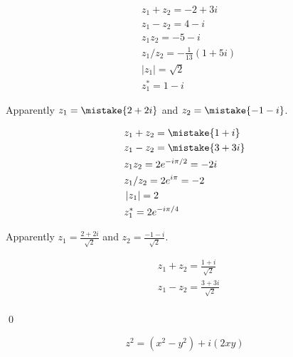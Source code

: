 \documentclass[12pt]{article}
\begin{document}
\begin{equation}
    \begin{split}
        &z_{1} + z_{2} = -2 + 3i \\
        &z_{1} - z_{2} = 4 - i \\
        &z_{1} z_{2} = -5 - i \\
        &z_{1}/z_{2} = -\frac{1}{13} (1 + 5i) \\
        &\left\lvert z_{1} \right\rvert = \sqrt{2} \\
        &z_{1}^{*} = 1 - i
    \end{split}
\end{equation}

Apparently $z_{1} = \mistake{2 + 2i}$ and $z_{2} = \mistake{-1 - i}$.

\begin{equation}
    \begin{split}
        &z_{1} + z_{2} = \mistake{1 + i} \\
        &z_{1} - z_{2} = \mistake{3 + 3i} \\
        &z_{1} z_{2} = 2 e^{-i \pi/2} = -2i\\
        &z_{1}/z_{2} = 2 e^{i \pi} = -2\\
        &\left\lvert z_{1} \right\rvert = 2 \\
        &z_{1}^{*} = 2 e^{-i \pi/4}
    \end{split}
\end{equation}

\begin{correction}
    Apparently $z_{1} = \frac{2 + 2i}{\sqrt{2}}$ and $z_{2} = \frac{-1 - i}{\sqrt{2}}$.

    \begin{equation*}
        \begin{split}
            &z_{1} + z_{2} = \frac{1 + i}{\sqrt{2}} \\
            &z_{1} - z_{2} = \frac{3 + 3i}{\sqrt{2}} \\
        \end{split}
    \end{equation*}
\end{correction}
\qed




\begin{equation}
    z^{2} = (x^{2} - y^{2}) + i(2xy)
\end{equation}

\end{document}
